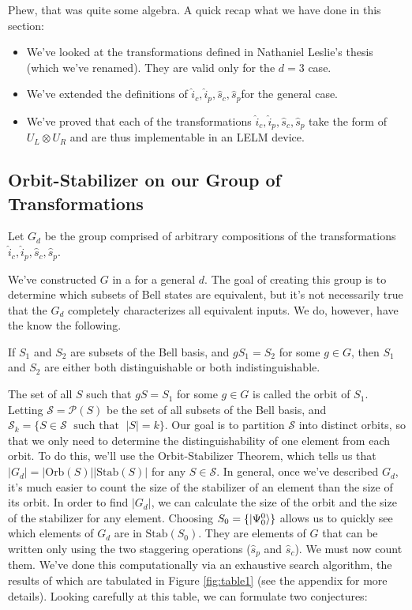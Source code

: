 Phew, that was quite some algebra. A quick recap what we have done in this section:
\begin{itemize}
  \item We've looked at the transformations defined in Nathaniel Leslie's thesis (which we've renamed). They are valid only for the $d=3$ case.
  \item We've extended the definitions of $\hat{i}_c, \hat{i}_p,\hat{s}_c, \hat{s}_p$for the general \qudit case.
  \item We've proved that each of the transformations $\hat{i}_c, \hat{i}_p,\hat{s}_c, \hat{s}_p$ take the form of $U_L \otimes U_R$ and are thus implementable in an LELM device.
\end{itemize}


\subsection{Orbit-Stabilizer on our Group of Transformations}

Let $G_d$ be the group comprised of arbitrary compositions of the transformations $\hat{i}_c, \hat{i}_p,\hat{s}_c, \hat{s}_p$.

We've constructed $G$ in a for a general $d$. The goal of creating this group is to determine which subsets of Bell states are equivalent, but it's not necessarily true that the $G_d$ completely characterizes all equivalent inputs. We do, however, have the know the following.
\begin{theorem}
  If $S_1$ and $S_2$ are subsets of the Bell basis, and $g S_1 = S_2$ for some $g \in G$, then $S_1$ and $S_2$ are either both distinguishable or both indistinguishable. 
\end{theorem}
The set of all $S$ such that $gS = S_1$ for some $g \in G$ is called the orbit of $S_1$. Letting $\mathcal{S} = \mathcal{P}(S)$ be the set of all subsets of the Bell basis, and $\mathcal{S}_k = \{S \in \mathcal{S} \; \text{ such that } \; |S| = k\}$. Our goal is to partition $\mathcal{S}$ into distinct orbits, so that we only need to determine the distinguishability of one element from each orbit. To do this, we'll use the Orbit-Stabilizer Theorem, which tells us that $|G_d| = |\text{Orb}(S)| |\text{Stab}(S)|$ for any $S \in \mathcal{S}$. In general, once we've described $G_d$, it's much easier to count the size of the stabilizer of an element than the size of its orbit. In order to find $|G_d|$, we can calculate the size of the orbit and the size of the stabilizer for any element. Choosing $S_0 = \{| \Psi_0^0 \rangle\}$ allows us to quickly see which elements of $G_d$ are in $\text{Stab}(S_0)$. They are elements of $G$ that can be written only using the two staggering operations ($\hat{s}_p$ and $\hat{s}_c$). We must now count them. We've done this computationally via an exhaustive search algorithm, the results of which are tabulated in Figure \ref{fig:table1} (see the appendix for more details). Looking carefully at this table, we can formulate two conjectures:

